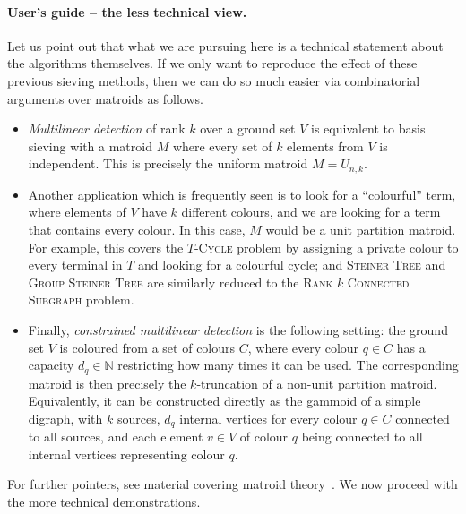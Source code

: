 \documentclass{theoretics}
\newcommand{\N}{\ensuremath{\mathbb N}\xspace}
\begin{document}
\paragraph{User's guide -- the less technical view.}
Let us point out that what we are pursuing here is a technical statement
about the algorithms themselves. If we only want to reproduce
the effect of these previous sieving methods, then we can do so
much easier via combinatorial arguments over matroids as follows.
\begin{itemize}
\item \emph{Multilinear detection} of rank $k$ over a ground set $V$
  is equivalent to basis sieving with a matroid $M$ where every set of
  $k$ elements from $V$ is independent. This is precisely the uniform matroid $M=U_{n,k}$.
\item Another application which is frequently seen is to look for a ``colourful''
  term, where elements of $V$ have $k$ different colours, and we are looking for
  a term that contains every colour. In this case, $M$ would be a unit partition matroid. 
  For example, this covers the \textsc{$T$-Cycle} problem by assigning a private
  colour to every terminal in $T$ and looking for a colourful cycle;
  and \textsc{Steiner Tree} and \textsc{Group Steiner Tree}
  are similarly reduced to the \textsc{Rank $k$ Connected Subgraph} problem.
\item Finally, \emph{constrained multilinear detection} is the following setting:
  the ground set $V$ is coloured from a set of colours $C$, where every colour $q \in C$
  has a capacity $d_q \in \N$ restricting how many times it can be used.
  The corresponding matroid is then precisely the $k$-truncation of a non-unit partition matroid.
  Equivalently, it can be constructed directly as the gammoid of a simple digraph,
  with $k$ sources, $d_q$ internal vertices for every colour $q \in C$ connected to all sources,
  and each element $v \in V$ of colour $q$ being connected to all internal vertices representing colour $q$.
\end{itemize}
For further pointers, see material covering matroid theory~\cite{OxleyBook,Marx09-matroid,Schrijver}.
We now proceed with the more technical demonstrations.
\end{document}
